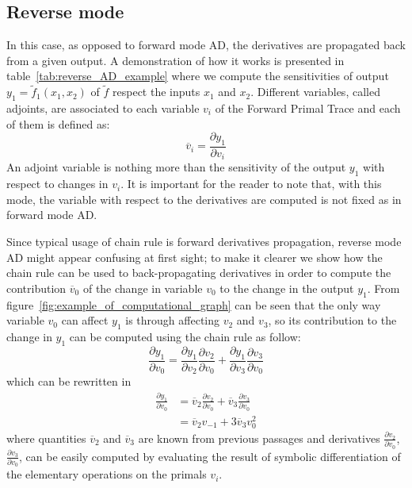 
\subsection{Reverse mode}
\label{subsec:reverse_mode_AD}

In this case, as opposed to forward mode AD, the derivatives are propagated back from a given output. A demonstration of how it works is presented in table~\ref{tab:reverse_AD_example} where we compute the sensitivities of output $y_1 = \tilde{f}_1(x_1, x_2)$ of $\tilde{f}$ respect the inputs $x_1$ and $x_2$. Different variables, called adjoints, are associated to each variable $v_i$ of the Forward Primal Trace and each of them is defined as:
\[
\overline{v}_i = \frac{\partial y_1}{\partial v_i}
\]
An adjoint variable is nothing more than the sensitivity of the output $y_1$ with respect to changes in $v_i$. It is important for the reader to note that, with this mode, the variable with respect to the derivatives are computed is not fixed as in forward mode AD.

Since typical usage of chain rule is forward derivatives propagation, reverse mode AD might appear confusing at first sight; to make it clearer we show how the chain rule can be used to back-propagating derivatives in order to compute the contribution $\overline{v}_0$ of the change in variable $v_0$ to the change in the output $y_1$. From figure~\ref{fig:example_of_computational_graph} can be seen that the only way variable $v_0$ can affect $y_1$ is through affecting $v_2$ and $v_3$, so its contribution to the change in $y_1$ can be computed using the chain rule as follow:
\begin{equation}
	\frac{\partial y_1}{\partial v_0} = \frac{\partial y_1}{\partial v_2} \frac{\partial v_2}{\partial v_0} + \frac{\partial y_1}{\partial v_3} \frac{\partial v_3}{\partial v_0}
\end{equation}
which can be rewritten in
\begin{equation}
	\begin{split}
		\frac{\partial y_1}{\partial v_0} & = \overline{v}_2 \frac{\partial v_2}{\partial v_0} + \overline{v}_3 \frac{\partial v_3}{\partial v_0}  \\[2ex]
										  & = \overline{v}_2 v_{-1} + 3 \overline{v}_3 v_0^2
	\end{split}
\end{equation}
where quantities $\overline{v}_2$ and $\overline{v}_3$ are known from previous passages and derivatives $\frac{\partial v_2}{\partial v_0}$, $\frac{\partial v_3}{\partial v_0}$, can be easily computed by evaluating the result of symbolic differentiation of the elementary operations on the primals $v_i$.

